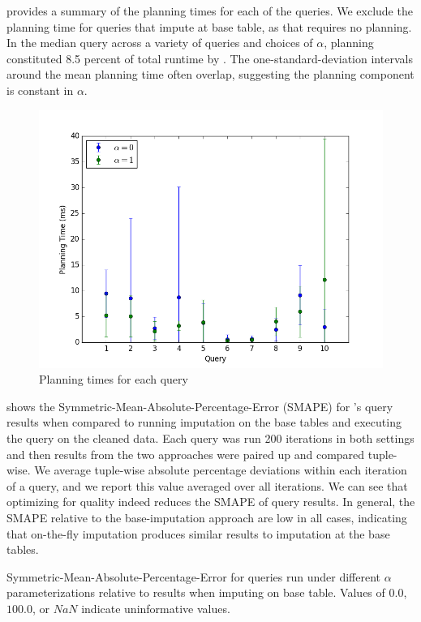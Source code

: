  provides a summary of the planning times for each of the queries.
We exclude the planning time for queries that impute at base table, as that requires no
planning. In the median query across a variety of queries and choices of $\alpha$, planning
constituted 8.5 percent of total runtime by \ProjectName{}. The one-standard-deviation
intervals around the mean planning time often overlap, suggesting the planning component is
constant in $\alpha$.

\begin{figure}
\includegraphics[width=\columnwidth]{figures/planning_times_imputedb.png}
\caption{Planning times for each query}
\label{fig:plantimes}
\end{figure}

 shows the Symmetric-Mean-Absolute-Percentage-Error (SMAPE) for
\ProjectName{}'s query results when compared to running imputation on the base tables and
executing the query on the cleaned data. Each query was run 200 iterations in both settings
and then results from the two approaches were paired up and compared tuple-wise. We average
tuple-wise absolute percentage deviations within each iteration of a query, and we report
this value averaged over all iterations.  We can see that optimizing for quality indeed
reduces the SMAPE of query results. In general, the SMAPE relative to the base-imputation
approach are low in all cases, indicating that on-the-fly imputation produces similar
results to imputation at the base tables.

\begin{table}
\centering

\caption{Symmetric-Mean-Absolute-Percentage-Error for queries run under different $\alpha$
    parameterizations relative to results when imputing on base table. Values of $0.0$,
    $100.0$, or $NaN$ indicate uninformative values.} %
\label{table:smape}
\end{table}

